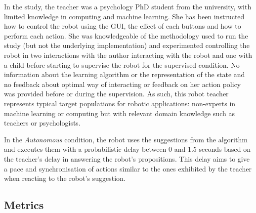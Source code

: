 In the study, the teacher was a psychology PhD student from the university, with limited knowledge in computing and machine learning. She has been instructed how to control the robot using the GUI, the effect of each buttons and how to perform each action. She was knowledgeable of the methodology used to run the study (but not the underlying implementation) and experimented controlling the robot in two interactions with the author interacting with the robot and one with a child before starting to supervise the robot for the supervised condition. No information about the learning algorithm or the representation of the state and no feedback about optimal way of interacting or feedback on her action policy was provided before or during the supervision. As such, this robot teacher represents typical target populations for robotic applications: non-experts in machine learning or computing but with relevant domain knowledge such as teachers or psychologists.

In the \textit{Autonomous} condition, the robot uses the suggestions from the algorithm and executes them with a probabilistic delay between 0 and 1.5 seconds based on the teacher's delay in answering the robot's propositions. This delay aims to give a pace and synchronisation of actions similar to the ones exhibited by the teacher when reacting to the robot's suggestion.


\subsection{Metrics}


